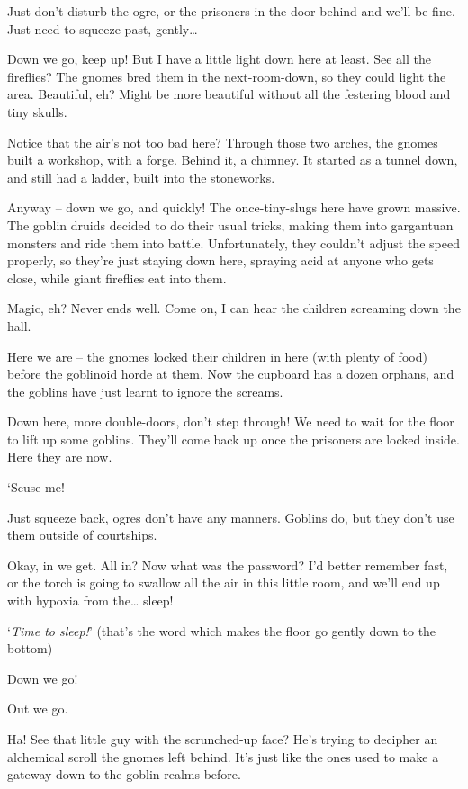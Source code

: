 \begin{multicols}{2}
\begin{exampletext}
Just don't disturb the ogre, or the prisoners in the door behind and we'll be fine.
Just need to squeeze past, gently\ldots

Down we go, keep up!
But I have a little light down here at least.
See all the fireflies?
The gnomes bred them in the next-room-down, so they could light the area.
Beautiful, eh?
Might be more beautiful without all the festering blood and tiny skulls.


Notice that the air's not too bad here?
Through those two arches, the gnomes built a workshop, with a forge.
Behind it, a chimney.
It started as a tunnel down, and still had a ladder, built into the stoneworks.

Anyway -- down we go, and quickly!
The once-tiny-slugs here have grown massive.
The goblin druids decided to do their usual tricks, making them into gargantuan monsters and ride them into battle.
Unfortunately, they couldn't adjust the speed properly, so they're just staying down here, spraying acid at anyone who gets close, while giant fireflies eat into them.

Magic, eh?
Never ends well.
Come on, I can hear the children screaming down the hall.

Here we are -- the gnomes locked their children in here (with plenty of food) before the goblinoid horde at them.
Now the cupboard has a dozen orphans, and the goblins have just learnt to ignore the screams.


Down here, more double-doors, don't step through!
We need to wait for the floor to lift up some goblins.
They'll come back up once the prisoners are locked inside.
Here they are now.

`Scuse me!

Just squeeze back, ogres don't have any manners.
Goblins do, but they don't use them outside of courtships.

Okay, in we get.
All in?
Now what was the password?
I'd better remember fast, or the torch is going to swallow all the air in this little room, and we'll end up with hypoxia from the\ldots
sleep!

`\textit{Time to sleep!}'
(that's the word which makes the floor go gently down to the bottom)

Down we go!

Out we go.

Ha!
See that little guy with the scrunched-up face?
He's trying to decipher an alchemical scroll the gnomes left behind.
It's just like the ones used to make a gateway down to the goblin realms before.


\end{exampletext}
\end{multicols}
